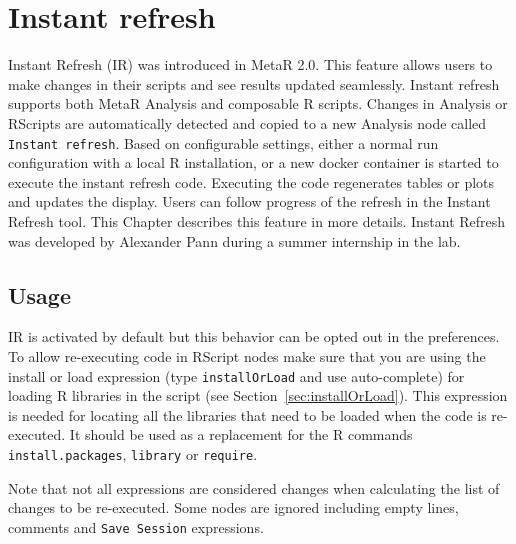

\chapter{Instant refresh}\label{chap:InstantRefresh}
Instant Refresh (IR) was introduced in MetaR 2.0. This feature allows users to make changes in their scripts and see results updated seamlessly. Instant refresh supports both MetaR Analysis and composable R scripts.  
Changes in Analysis or RScripts are automatically detected and copied to a new Analysis node called \texttt{Instant refresh}. Based on configurable settings, either a normal run configuration with a local R installation, or a new docker container is started to execute the instant refresh code. Executing the code regenerates tables or plots and updates the display. Users can follow progress of the refresh in the Instant Refresh tool. This Chapter describes this feature in more details. Instant Refresh was developed by Alexander Pann during a summer internship in the lab.

\section{Usage}
IR is activated by default but this behavior can be opted out in the preferences.
To allow re-executing code in RScript nodes make sure that you are using
the install or load expression (type \texttt{installOrLoad} and use auto-complete) for loading R libraries in the script (see Section~\ref{sec:installOrLoad}). This expression is needed for locating all the libraries
that need to be loaded when the code is re-executed. It should be used as a
replacement for the R commands \texttt{install.packages}, \texttt{library} or \texttt{require}.

\begin{remark}
Note that not all expressions are considered changes when calculating the list of changes to be re-executed. Some nodes are ignored including empty lines, comments and \texttt{Save Session} expressions.
\end{remark}


